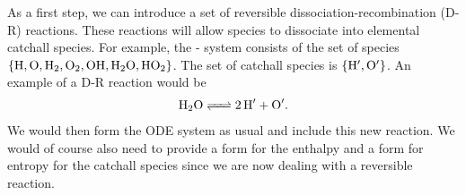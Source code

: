 As a first step, we can introduce a set of reversible dissociation-recombination 
(D-R) reactions.  These reactions will allow species to dissociate into elemental 
catchall species.  For example, the - system consists of the set 
of species $\left\{\ce{H}, \ce{O}, \ce{H2}, \ce{O2}, \ce{OH}, \ce{H2O}, \ce{HO2}\right\}$. 
The set of catchall species is $\left\{\ce{H}^{\prime}, \ce{O}^{\prime}\right\}$. 
An example of a D-R reaction would be 
\begin{align}
  \ce{H2O <=> 2H^{\prime} + O^{\prime}}.
\end{align} 
We would then form the ODE system as usual and include this new reaction.  We 
would of course also need to provide a form for the enthalpy and a form for 
entropy for the catchall species since we are now dealing with a reversible 
reaction.  


